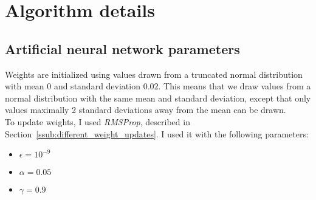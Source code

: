 \appendices
\chapter{Algorithm details}
\section{Artificial neural network parameters} %
\label{sec:artificial_neural_network_parameters}

Weights are initialized using values drawn from a truncated normal distribution with mean $0$ and standard deviation $0.02$. This means that we draw values from a normal distribution with the same mean and standard deviation, except that only values maximally 2 standard deviations away from the mean can be drawn.\\
To update weights, I used \textit{RMSProp}, described in Section~\ref{ssub:different_weight_updates}. I used it with the following parameters:
\begin{itemize}
    \item $\epsilon = 10^{-9}$
    \item $\alpha = 0.05$
    \item $\gamma = 0.9$
\end{itemize}

